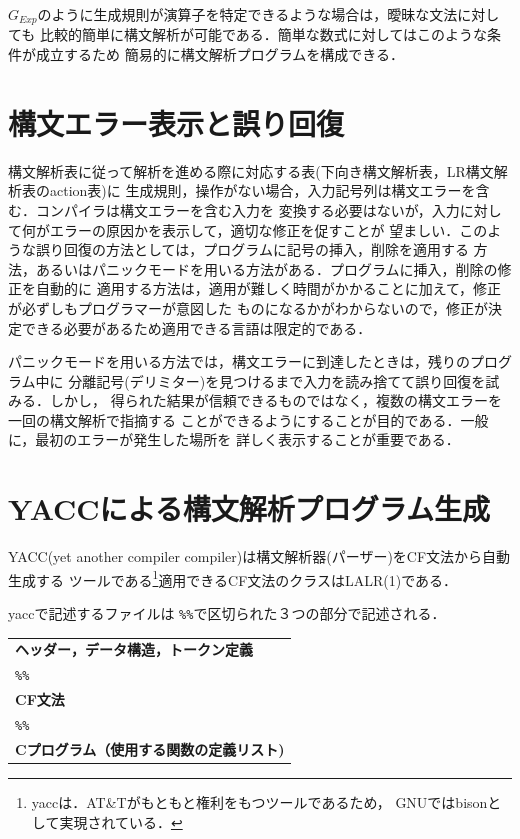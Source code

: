 \documentclass[a4j,dvipdfmx]{jbook}
\begin{document}
$G_{Exp}$のように生成規則が演算子を特定できるような場合は，曖昧な文法に対しても
比較的簡単に構文解析が可能である．簡単な数式に対してはこのような条件が成立するため
簡易的に構文解析プログラムを構成できる．

\section{構文エラー表示と誤り回復}

構文解析表に従って解析を進める際に対応する表(下向き構文解析表，LR構文解析表のaction表)に
生成規則，操作がない場合，入力記号列は構文エラーを含む．コンパイラは構文エラーを含む入力を
変換する必要はないが，入力に対して何がエラーの原因かを表示して，適切な修正を促すことが
望ましい．このような誤り回復の方法としては，プログラムに記号の挿入，削除を適用する
方法，あるいはパニックモードを用いる方法がある．プログラムに挿入，削除の修正を自動的に
適用する方法は，適用が難しく時間がかかることに加えて，修正が必ずしもプログラマーが意図した
ものになるかがわからないので，修正が決定できる必要があるため適用できる言語は限定的である．

パニックモードを用いる方法では，構文エラーに到達したときは，残りのプログラム中に
分離記号(デリミター)を見つけるまで入力を読み捨てて誤り回復を試みる．しかし，
得られた結果が信頼できるものではなく，複数の構文エラーを一回の構文解析で指摘する
ことができるようにすることが目的である．一般に，最初のエラーが発生した場所を
詳しく表示することが重要である．

\section{YACCによる構文解析プログラム生成}

YACC(yet another compiler compiler)は構文解析器(パーザー)をCF文法から自動生成する
ツールである\footnote{yaccは．AT\&Tがもともと権利をもつツールであるため，
GNUではbisonとして実現されている．}適用できるCF文法のクラスはLALR(1)である．

yaccで記述するファイルは \verb|%%|で区切られた３つの部分で記述される．
\begin{center}

  \begin{minipage}{0.6\linewidth}
  \begin{tabularx}{\linewidth}{l}
    {\bf ヘッダー，データ構造，トークン定義}\\[10pt]
    \texttt{\%\%}\\[10pt]
    {\bf CF文法}\\[10pt]
    \texttt{\%\%}\\[10pt]
    {\bf Cプログラム（使用する関数の定義リスト)}\\
  \end{tabularx}
\end{minipage}
\end{center}
\end{document}

